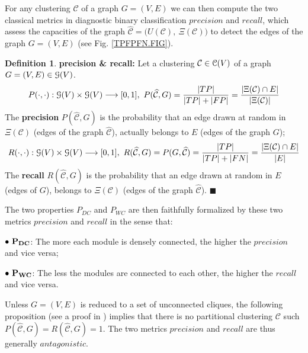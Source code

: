 \documentclass[12pt]{article}
\theoremstyle{thmstyleone}%
\theoremstyle{definition}
\newtheorem{definition}{Definition}
\begin{document}
For any clustering $\mathcal{C}$ of a graph $G=(V,E)$ we can then compute the two classical metrics in diagnostic binary classification
$precision$ and $recall$, which assess the capacities of the graph $\widehat{\mathcal{C}}=\big(U(\mathcal{C}),~\Xi(\mathcal{C})\big)$ to detect the edges of the graph $G=(V,E)$ (see Fig. \ref{TPFPFN.FIG}).

\begin{definition} {\bf precision \& recall: } Let a clustering $\mathcal{C}\in\EuScript{C}(V)$ of a graph $G=(V,E)\in\EuScript{G}(V)$.
\begin{equation}\label{P(C,G)}
    P(\cdot,\cdot):\EuScript{G}(V)\times\EuScript{G}(V)\longrightarrow[0,1],~P(\widehat{\mathcal{C}},G)=\frac{|TP|}{|TP| + |FP|}=\frac{|\Xi(\mathcal{C}) \cap E|}{|\Xi(\mathcal{C})|}\\
\end{equation}
    {The {\bf precision} $P(\widehat{\mathcal{C}},G)$ is the probability that an edge drawn at random in $\Xi(\mathcal{C})$ (edges of the graph $\widehat{\mathcal{C}}$), actually belongs to $E$ (edges of the graph $G$)};
\begin{equation} \label{R(C,G)}
       R(\cdot,\cdot):\EuScript{G}(V)\times\EuScript{G}(V)\longrightarrow[0,1],~R(\widehat{\mathcal{C}},G)=P(G,\widehat{\mathcal{C}})=\frac{|TP|}{|TP| + |FN|}=\frac{|\Xi(\mathcal{C}) \cap E|}{|E|}
\end{equation}
      {The {\bf recall} $R(\widehat{\mathcal{C}},G)$ is the probability that an edge drawn at random in $E$ (edges of $G$), belongs to $\Xi(\mathcal{C})$ (edges of the graph $\widehat{\mathcal{C}}$)}.
$\blacksquare$
\end{definition}

The two properties $P_{DC}$ and $P_{WC}$ are then faithfully formalized by these two metrics $precision$ and $recall$ in the sense that:

 \noindent
 \hspace{0.2cm}$\bf \bullet~P_{DC}$: The more each module is densely connected, the higher the $precision$ and vice versa;

 \noindent
 \hspace{0.2cm}$\bf \bullet~P_{WC}$: The less the modules are connected to each other, the higher the $recall$ and vice versa.

Unless $G=(V,E)$ is reduced to a set of unconnected cliques, the following proposition
(see a proof in \cite{Gaume_BEC1_2025}) implies that there is no partitional clustering $\mathcal{C}$ such $P(\widehat{\mathcal{C}},G) = R(\widehat{\mathcal{C}},G) = 1$. The two metrics $precision$ and $recall$ are thus generally $antagonistic$.
\end{document}
